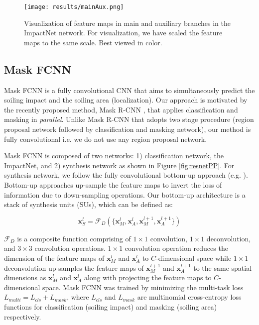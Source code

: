 \documentclass[10pt,twocolumn,letterpaper]{article}
\begin{document}
\begin{figure}[b!]
\centering
\texttt{[image: results/mainAux.png]}
\setlength{\belowcaptionskip}{-4mm}
\caption{Visualization of feature maps in main and auxiliary branches in the ImpactNet network. For visualization, we have scaled the feature maps to the same scale. Best viewed in color.}
\label{fig:mainAux}
\end{figure}

\subsection{Mask FCNN}
Mask FCNN is a fully convolutional CNN that aims to simultaneously predict the soiling impact and the soiling area (localization). Our approach is motivated by the recently proposed method, Mask R-CNN \cite{he2017maskrcnn}, that applies classification and masking in \textit{parallel}. Unlike Mask R-CNN that adopts two stage procedure (region proposal network followed by classification and masking network), our method is fully convolutional i.e. we do not use any region proposal network.

Mask FCNN is composed of two networks: 1) classification network, the ImpactNet, and 2) synthesis network as shown in Figure \ref{fig:resnetPP}. For synthesis network, we follow the fully convolutional bottom-up approach (e.g. \cite{badrinarayanan2017segnet, noh2015learning, ronneberger2015u}). Bottom-up approaches up-sample the feature maps to invert the loss of information due to down-sampling operations. Our bottom-up architecture is a stack of synthesis units (SUs), which can be defined as:

\begin{equation}
\mathbf{x}_S^l = \mathcal{F}_D(\{\mathbf{x}_M^l, \mathbf{x}_A^l,  \mathbf{x}_M^{l+1}, \mathbf{x}_A^{l+1}\})
\end{equation}

$\mathcal{F}_D$ is a composite function comprising of $1\times1$ convolution, $1\times1$ deconvolution, and $3\times3$ convolution operations. $1\times1$ convolution operation reduces the dimension of the feature maps of $\mathbf{x}_M^{l}$ and $\mathbf{x}_A^{l}$ to $C$-dimensional space while $1\times1$ deconvolution up-samples the feature maps of $\mathbf{x}_M^{l+1}$ and $\mathbf{x}_A^{l+1}$ to the same spatial dimensions as $\mathbf{x}_M^{l}$ and $\mathbf{x}_A^{l}$ along with projecting the feature maps to $C$-dimensional space. Mask FCNN was trained by minimizing the multi-task loss $L_{multi}= L_{cls} + L_{mask}$, where $L_{cls}$ and $L_{mask}$ are multinomial cross-entropy loss functions for classification (soiling impact) and masking (soiling area) respectively.
\end{document}
